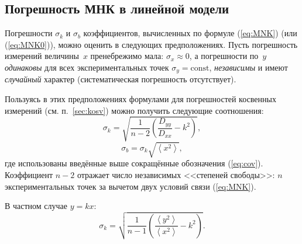 
\subsection{Погрешность МНК в линейной модели}\label{sec:MNKerror}

Погрешности $\sigma_{k}$ и $\sigma_{b}$ коэффициентов, вычисленных
по формуле (\ref{eq:MNK}) (или (\ref{eq:MNK0})), можно оценить в
следующих предположениях.
Пусть погрешность измерений величины~$x$ пренебрежимо мала: $\sigma_{x}\approx0$,
а погрешности по~$y$ \emph{одинаковы} для всех экспериментальных точек
$\sigma_{y}=\mathrm{const}$, \emph{независимы} и имеют \emph{случайный} характер
(систематическая погрешность отсутствует).

Пользуясь в этих предположениях формулами для погрешностей косвенных
измерений (см. п.~\ref{sec:kosv}) можно получить следующие
соотношения:
\begin{equation}
    \sigma_{k}=\sqrt{\frac{1}{n-2}\left(\frac{D_{yy}}{D_{xx}}-k^{2}\right)},
    \label{eq:MNK_sigma_k}
\end{equation}
\begin{equation}
    \sigma_{b}=\sigma_{k}\sqrt{\left\langle x^{2}\right\rangle
    },\label{eq:MNK_sigma_b}
\end{equation}
где использованы введённые выше сокращённые обозначения (\ref{eq:cov}).
Коэффициент $n-2$ отражает число независимых <<степеней
свободы>>: $n$ экспериментальных точек за вычетом двух
условий связи (\ref{eq:MNK}).

В частном случае $y=kx$:
\begin{equation}
\sigma_{k}=\sqrt{\frac{1}{n-1}\left(\frac{\left\langle y^{2}\right\rangle
}{\left\langle x^{2}\right\rangle }-k^{2}\right)}.\label{eq:MNK_sigma0}
\end{equation}


